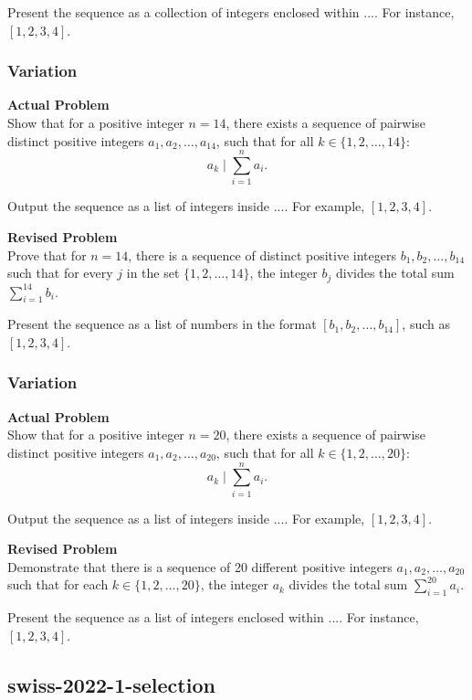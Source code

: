 Present the sequence as a collection of integers enclosed within $\boxed{...}$. For instance, $\boxed{[1, 2, 3, 4]}$.

\subsubsection{Variation}
\textbf{Actual Problem}\\
Show that for a positive integer $n=14$, there exists a sequence of pairwise distinct positive integers $a_1, a_2, \ldots, a_{14}$, such that for all $k \in \{1,2,\ldots,14\}$: $$a_k \mid \sum_{i=1}^{n} a_i.$$

Output the sequence as a list of integers inside $\boxed{...}$. For example, $\boxed{[1,2,3,4]}$.

\textbf{Revised Problem}\\
Prove that for $n=14$, there is a sequence of distinct positive integers $b_1, b_2, \ldots, b_{14}$ such that for every $j$ in the set $\{1, 2, \ldots, 14\}$, the integer $b_j$ divides the total sum $\sum_{i=1}^{14} b_i$.

Present the sequence as a list of numbers in the format $\boxed{[b_1, b_2, \ldots, b_{14}]}$, such as $\boxed{[1, 2, 3, 4]}$.

\subsubsection{Variation}
\textbf{Actual Problem}\\
Show that for a positive integer $n=20$, there exists a sequence of pairwise distinct positive integers $a_1, a_2, \ldots, a_{20}$, such that for all $k \in \{1,2,\ldots,20\}$: $$a_k \mid \sum_{i=1}^{n} a_i.$$

Output the sequence as a list of integers inside $\boxed{...}$. For example, $\boxed{[1,2,3,4]}$.

\textbf{Revised Problem}\\
Demonstrate that there is a sequence of 20 different positive integers $a_1, a_2, \ldots, a_{20}$ such that for each $k \in \{1,2,\ldots,20\}$, the integer $a_k$ divides the total sum $\sum_{i=1}^{20} a_i$.

Present the sequence as a list of integers enclosed within $\boxed{...}$. For instance, $\boxed{[1,2,3,4]}$.

\subsection{swiss-2022-1-selection}
